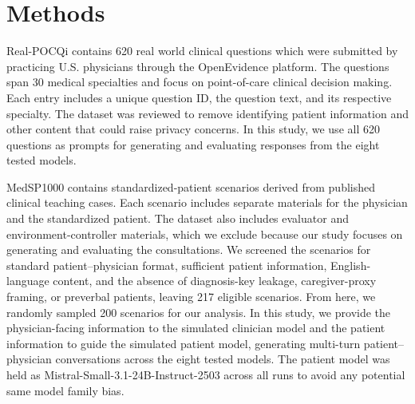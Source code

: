 \documentclass[11pt]{article}
\begin{document}












\section{Methods}



Real-POCQi contains 620 real world clinical questions which were submitted by practicing U.S. physicians through the OpenEvidence platform. The questions span 30 medical specialties and focus on point-of-care clinical decision making. Each entry includes a unique question ID, the question text, and its respective specialty. The dataset was reviewed to remove identifying patient information and other content that could raise privacy concerns. In this study, we use all 620 questions as prompts for generating and evaluating responses from the eight tested models.

MedSP1000 contains standardized-patient scenarios derived from published clinical teaching cases. Each scenario includes separate materials for the physician and the standardized patient. The dataset also includes evaluator and environment-controller materials, which we exclude because our study focuses on generating and evaluating the consultations. We screened the scenarios for standard patient–physician format, sufficient patient information, English-language content, and the absence of diagnosis-key leakage, caregiver-proxy framing, or preverbal patients, leaving 217 eligible scenarios. From here, we randomly sampled 200 scenarios for our analysis. In this study, we provide the physician-facing information to the simulated clinician model and the patient information to guide the simulated patient model, generating multi-turn patient–physician conversations across the eight tested models. The patient model was held as Mistral-Small-3.1-24B-Instruct-2503 across all runs to avoid any potential same model family bias.
\end{document}
